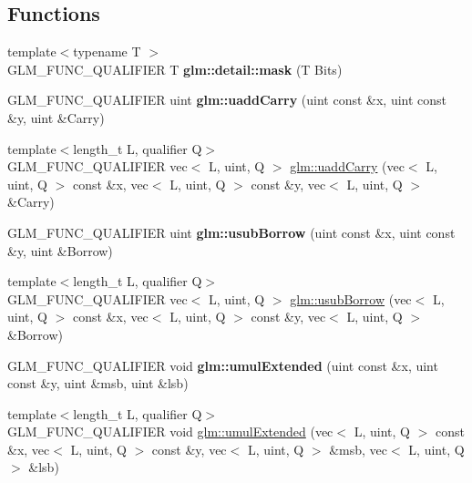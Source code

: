 \subsection*{Functions}
\begin{DoxyCompactItemize}
\item 
\mbox{\label{func__integer_8inl_a048ad00e8777f9f3ebe185ed48857df0}} 
{\footnotesize template$<$typename T $>$ }\\G\+L\+M\+\_\+\+F\+U\+N\+C\+\_\+\+Q\+U\+A\+L\+I\+F\+I\+ER T {\bfseries glm\+::detail\+::mask} (T Bits)
\item 
\mbox{\label{func__integer_8inl_a541d30d3289d3a3da69edec69df11a04}} 
G\+L\+M\+\_\+\+F\+U\+N\+C\+\_\+\+Q\+U\+A\+L\+I\+F\+I\+ER uint {\bfseries glm\+::uadd\+Carry} (uint const \&x, uint const \&y, uint \&Carry)
\item 
{\footnotesize template$<$length\+\_\+t L, qualifier Q$>$ }\\G\+L\+M\+\_\+\+F\+U\+N\+C\+\_\+\+Q\+U\+A\+L\+I\+F\+I\+ER vec$<$ L, uint, Q $>$ \hyperlink{group__core__func__integer_gaedcec48743632dff6786bcc492074b1b}{glm\+::uadd\+Carry} (vec$<$ L, uint, Q $>$ const \&x, vec$<$ L, uint, Q $>$ const \&y, vec$<$ L, uint, Q $>$ \&Carry)
\item 
\mbox{\label{func__integer_8inl_ac7a75ea277a43b855920597adeebb2e3}} 
G\+L\+M\+\_\+\+F\+U\+N\+C\+\_\+\+Q\+U\+A\+L\+I\+F\+I\+ER uint {\bfseries glm\+::usub\+Borrow} (uint const \&x, uint const \&y, uint \&Borrow)
\item 
{\footnotesize template$<$length\+\_\+t L, qualifier Q$>$ }\\G\+L\+M\+\_\+\+F\+U\+N\+C\+\_\+\+Q\+U\+A\+L\+I\+F\+I\+ER vec$<$ L, uint, Q $>$ \hyperlink{group__core__func__integer_gae3316ba1229ad9b9f09480833321b053}{glm\+::usub\+Borrow} (vec$<$ L, uint, Q $>$ const \&x, vec$<$ L, uint, Q $>$ const \&y, vec$<$ L, uint, Q $>$ \&Borrow)
\item 
\mbox{\label{func__integer_8inl_a8d2521311c96c4b426be9857010b6b76}} 
G\+L\+M\+\_\+\+F\+U\+N\+C\+\_\+\+Q\+U\+A\+L\+I\+F\+I\+ER void {\bfseries glm\+::umul\+Extended} (uint const \&x, uint const \&y, uint \&msb, uint \&lsb)
\item 
{\footnotesize template$<$length\+\_\+t L, qualifier Q$>$ }\\G\+L\+M\+\_\+\+F\+U\+N\+C\+\_\+\+Q\+U\+A\+L\+I\+F\+I\+ER void \hyperlink{group__core__func__integer_ga732e2fb56db57ea541c7e5c92b7121be}{glm\+::umul\+Extended} (vec$<$ L, uint, Q $>$ const \&x, vec$<$ L, uint, Q $>$ const \&y, vec$<$ L, uint, Q $>$ \&msb, vec$<$ L, uint, Q $>$ \&lsb)

\end{DoxyCompactItemize}
